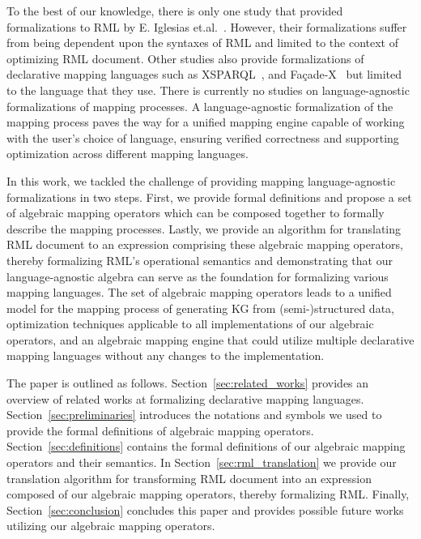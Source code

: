 To the best of our knowledge, there is only one study that provided 
formalizations to RML by E. Iglesias et.al.~\cite{Iglesias2022ScalingKnowledgeGraph}.
However, their formalizations suffer from being dependent upon the syntaxes 
of RML and limited to the context of optimizing RML document.
Other studies also provide formalizations of declarative mapping languages such
as XSPARQL~\cite{Lopes2011XSPARQL}, and Façade-X~\cite{asprino2023knowledge}
but limited to the language that they use. 
There is currently no studies on language-agnostic formalizations of 
mapping processes. 
A language-agnostic formalization of the mapping process paves the way for a
unified mapping engine capable of working with the user's choice of language,
ensuring verified correctness and supporting optimization across different
mapping languages.

In this work, we tackled the challenge of providing mapping language-agnostic
formalizations in two steps.
First, we provide formal definitions and propose a set of algebraic mapping
operators which can be composed together to formally describe the mapping
processes. 
Lastly, we provide an algorithm for translating RML document
to an expression comprising these algebraic mapping operators,
thereby formalizing RML's operational semantics and demonstrating that our 
language-agnostic algebra can serve as the foundation for formalizing
various mapping languages. 
The set of algebraic mapping operators leads to a unified model for 
the mapping process of generating KG from (semi-)structured data, 
optimization techniques applicable to all implementations of our 
algebraic operators, and an algebraic mapping engine that could utilize 
multiple declarative mapping languages without any changes to the 
implementation.


The paper is outlined as follows. 
Section~\ref{sec:related_works} provides an overview of related works at 
formalizing declarative mapping languages. 
Section~\ref{sec:preliminaries} introduces the notations and symbols we 
used to provide the formal definitions of algebraic mapping operators. 
Section~\ref{sec:definitions} contains the formal definitions of 
our algebraic mapping operators and their semantics. 
In Section~\ref{sec:rml_translation} we provide our translation algorithm
for transforming RML document into an expression composed of our algebraic 
mapping operators, thereby formalizing RML. 
Finally, Section~\ref{sec:conclusion} concludes this paper and provides 
possible future works utilizing our algebraic mapping operators. 





